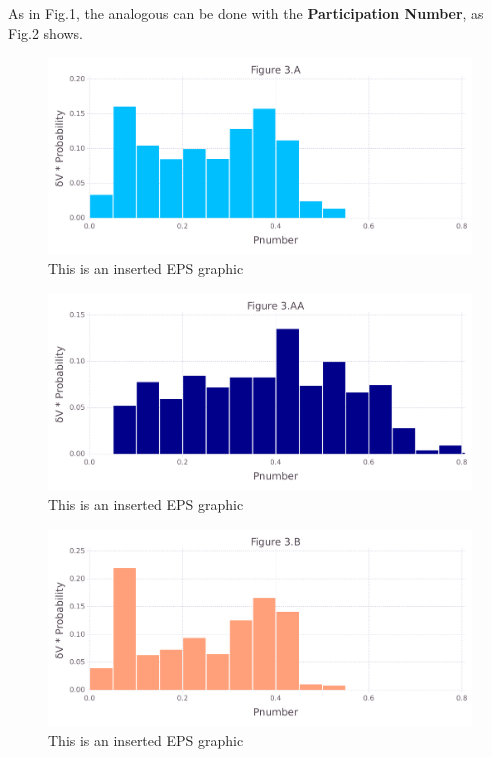 \documentclass[10pt,letterpaper]{article}
\begin{document}
\clearpage
As in Fig.1, the analogous can be done with the \textbf{Participation Number}, as Fig.2 shows.

\begin{figure}[ht]
\begin{center}
\includegraphics[scale=0.5]{1hvr_apo/3afigure_hi-precision.pdf}
\caption{This is an inserted EPS graphic}
\label{fig7}
\end{center}
\end{figure}

\begin{figure}[ht]
\begin{center}
\includegraphics[scale=0.5]{1hvr_apo/3aafigure_hi-precision.pdf}
\caption{This is an inserted EPS graphic}
\label{fig8}
\end{center}
\end{figure}

\begin{figure}[ht]
\begin{center}
\includegraphics[scale=0.5]{1hvr_apo/3bfigure_hi-precision.pdf}
\caption{This is an inserted EPS graphic}
\label{fig10}
\end{center}
\end{figure}
\end{document}
